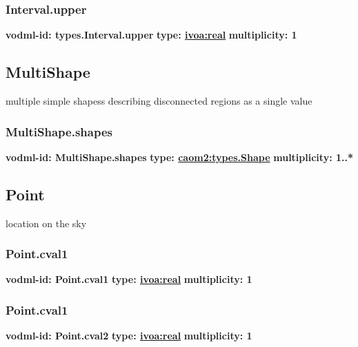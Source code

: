     \subsubsection{Interval.upper}
      \textbf{vodml-id: types.Interval.upper} \newline
      \textbf{type: \hyperref[sect:ivoa]{ivoa:real}} \newline
      \textbf{multiplicity: 1} 

  \subsection{MultiShape}
  \label{sect:types.MultiShape}
    multiple simple shapess describing disconnected regions as a single value

    \subsubsection{MultiShape.shapes}
      \textbf{vodml-id: MultiShape.shapes} \newline
      \textbf{type: \hyperref[sect:types.Shape]{caom2:types.Shape}} \newline
      \textbf{multiplicity: 1..*} 

  \subsection{Point}
  \label{sect:types.Point}
    location on the sky

    \subsubsection{Point.cval1}
      \textbf{vodml-id: Point.cval1} \newline
      \textbf{type: \hyperref[sect:ivoa]{ivoa:real}} \newline
      \textbf{multiplicity: 1} 

    \subsubsection{Point.cval1}
      \textbf{vodml-id: Point.cval2} \newline
      \textbf{type: \hyperref[sect:ivoa]{ivoa:real}} \newline
      \textbf{multiplicity: 1} 

